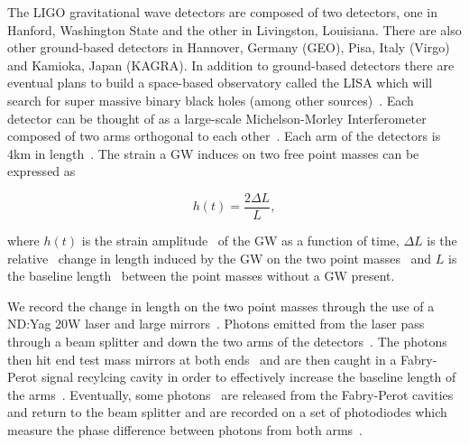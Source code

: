 %
%
The \ac{LIGO} gravitational wave detectors are composed of 
two detectors, one in Hanford, Washington State and the 
other in Livingston, Louisiana. There are also other ground-based detectors 
in Hannover, Germany (GEO), Pisa, Italy (Virgo) and Kamioka, Japan 
(KAGRA). In addition to ground-based detectors there are eventual plans 
to build a space-based observatory called the \ac{LISA} which 
will search for super massive binary black holes (among other 
sources)~. Each detector can be thought 
of as a large-scale Michelson-Morley Interferometer composed 
of two arms orthogonal to each other~. Each arm of 
the detectors is 4km in length~. The strain a \ac{GW} induces on two free point masses can be expressed as 

\begin{equation}
    h(t) = \frac{2 \Delta L}{L},
\end{equation}

where $h(t)$ is the strain amplitude~ of the \ac{GW} 
as a function of time, $\Delta L$ is 
the relative~ change in length induced by the \ac{GW} on the two 
point masses~ and $L$ is the baseline length~ between the point 
masses without a \ac{GW} present. 

We record the change in length 
on the two point masses through the use of a ND:Yag 20W 
laser and large mirrors~. Photons emitted from the laser pass through a beam 
splitter and down the two arms of the detectors~. The photons then hit end test mass mirrors at both ends~ 
and are then caught in a Fabry-Perot signal recylcing 
cavity in order to effectively increase the baseline 
length of the arms~. Eventually, some photons~ are released 
from the Fabry-Perot cavities and return to the beam splitter 
and are recorded on a set of photodiodes which measure 
the phase difference between photons from both 
arms~.

